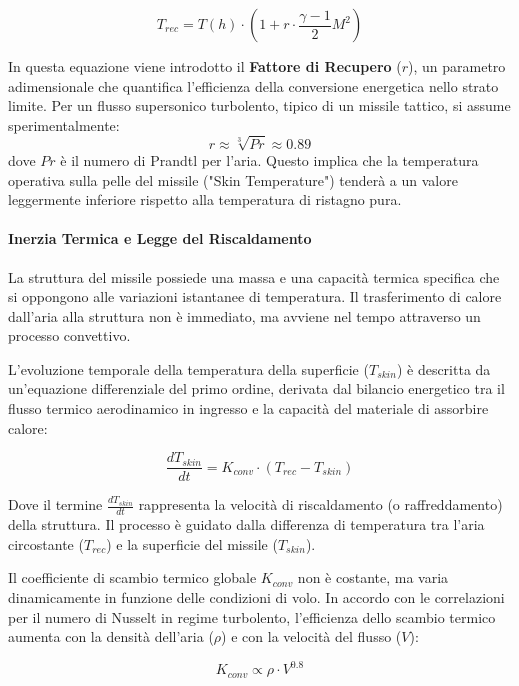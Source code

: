 \documentclass[12pt,a4paper]{article}
\begin{document}
\begin{equation}
    T_{rec} = T(h) \cdot \left( 1 + r \cdot \frac{\gamma - 1}{2} M^2 \right)
\end{equation}

In questa equazione viene introdotto il \textbf{Fattore di Recupero} ($r$), un parametro adimensionale che quantifica l'efficienza della conversione energetica nello strato limite. Per un flusso supersonico turbolento, tipico di un missile tattico, si assume sperimentalmente:
\[ r \approx \sqrt[3]{Pr} \approx 0.89 \]
dove $Pr$ è il numero di Prandtl per l'aria. Questo implica che la temperatura operativa sulla pelle del missile ("Skin Temperature") tenderà a un valore leggermente inferiore rispetto alla temperatura di ristagno pura.

\paragraph{Inerzia Termica e Legge del Riscaldamento}
La struttura del missile possiede una massa e una capacità termica specifica che si oppongono alle variazioni istantanee di temperatura. Il trasferimento di calore dall'aria alla struttura non è immediato, ma avviene nel tempo attraverso un processo convettivo. 

L'evoluzione temporale della temperatura della superficie ($T_{skin}$) è descritta da un'equazione differenziale del primo ordine, derivata dal bilancio energetico tra il flusso termico aerodinamico in ingresso e la capacità del materiale di assorbire calore:

\begin{equation}
    \frac{dT_{skin}}{dt} = K_{conv} \cdot (T_{rec} - T_{skin})
\end{equation}

Dove il termine $\frac{dT_{skin}}{dt}$ rappresenta la velocità di riscaldamento (o raffreddamento) della struttura. Il processo è guidato dalla differenza di temperatura tra l'aria circostante ($T_{rec}$) e la superficie del missile ($T_{skin}$).

Il coefficiente di scambio termico globale $K_{conv}$ non è costante, ma varia dinamicamente in funzione delle condizioni di volo. In accordo con le correlazioni per il numero di Nusselt in regime turbolento, l'efficienza dello scambio termico aumenta con la densità dell'aria ($\rho$) e con la velocità del flusso ($V$):

\begin{equation}
    K_{conv} \propto \rho \cdot V^{0.8}
\end{equation}
\end{document}
